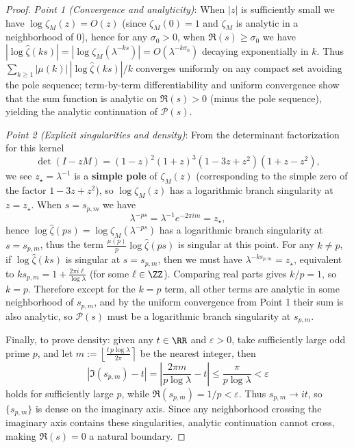 \begin{proof}
\emph{Point 1 (Convergence and analyticity)}:
When $|z|$ is sufficiently small we have $\log\zeta_M(z)=O(z)$ (since $\zeta_M(0)=1$ and $\zeta_M$ is analytic in a neighborhood of $0$), hence for any $\sigma_0>0$, when $\Re(s)\ge \sigma_0$ we have
\(
|\log\widehat{\zeta}(ks)|=|\log\zeta_M(\lambda^{-ks})|=O(\lambda^{-k\sigma_0})
\)
decaying exponentially in $k$. Thus $\sum_{k\ge 1}|\mu(k)|\,|\log\widehat{\zeta}(ks)|/k$ converges uniformly on any compact set avoiding the pole sequence; term-by-term differentiability and uniform convergence show that the sum function is analytic on $\Re(s)>0$ (minus the pole sequence), yielding the analytic continuation of $\mathcal{P}(s)$.

\emph{Point 2 (Explicit singularities and density)}:
From the determinant factorization for this kernel
\[
\det(I-zM)=(1-z)^2(1+z)^3(1-3z+z^2)(1+z-z^2),
\]
we see $z_\star=\lambda^{-1}$ is a \textbf{simple pole} of $\zeta_M(z)$ (corresponding to the simple zero of the factor $1-3z+z^2$), so $\log\zeta_M(z)$ has a logarithmic branch singularity at $z=z_\star$.
When $s=s_{p,m}$ we have
\[
\lambda^{-ps}=\lambda^{-1}e^{-2\pi i m}=z_\star,
\]
hence $\log\widehat{\zeta}(ps)=\log\zeta_M(\lambda^{-ps})$ has a logarithmic branch singularity at $s=s_{p,m}$, thus the term
\(
\frac{\mu(p)}{p}\log\widehat{\zeta}(ps)
\)
is singular at this point. For any $k\neq p$, if $\log\widehat{\zeta}(ks)$ is singular at $s=s_{p,m}$, then we must have $\lambda^{-ks_{p,m}}=z_\star$, equivalent to $ks_{p,m}=1+\frac{2\pi i \ell}{\log\lambda}$ (for some $\ell\in\ZZ$). Comparing real parts gives $k/p=1$, so $k=p$. Therefore except for the $k=p$ term, all other terms are analytic in some neighborhood of $s_{p,m}$, and by the uniform convergence from Point 1 their sum is also analytic, so $\mathcal{P}(s)$ must be a logarithmic branch singularity at $s_{p,m}$.

Finally, to prove density: given any $t\in\RR$ and $\varepsilon>0$, take sufficiently large odd prime $p$, and let
\(
m:=\left\lfloor \frac{t\,p\log\lambda}{2\pi}\right\rceil
\)
be the nearest integer, then
\[
\left|\Im(s_{p,m})-t\right|
=\left|\frac{2\pi m}{p\log\lambda}-t\right|
\le \frac{\pi}{p\log\lambda}<\varepsilon
\]
holds for sufficiently large $p$, while $\Re(s_{p,m})=1/p<\varepsilon$. Thus $s_{p,m}\to it$, so $\{s_{p,m}\}$ is dense on the imaginary axis. Since any neighborhood crossing the imaginary axis contains these singularities, analytic continuation cannot cross, making \(\Re(s)=0\) a natural boundary.
\end{proof}

